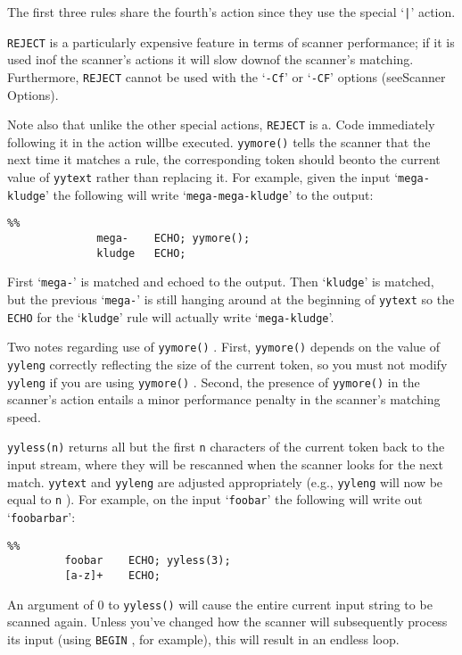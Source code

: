 \documentclass[openany,oneside]{book}
\begin{document}
The first three rules share the fourth's action since they use the
special ‘\verb`|`’ action.

 \verb`REJECT` is a particularly expensive feature in terms of scanner
performance; if it is used inof the scanner's actions it
will slow downof the scanner's matching.  Furthermore, \verb`REJECT` cannot be used with the ‘\verb`-Cf`’ or ‘\verb`-CF`’ options
(seeScanner Options).

Note also that unlike the other special actions, \verb`REJECT` is a.  Code immediately following it in the action willbe executed. \verb`yymore()` tells the scanner that the next time it matches a rule, the
corresponding token should beonto the current value of \verb`yytext` rather than replacing it.  For example, given the input
‘\verb`mega-kludge`’ the following will write ‘\verb`mega-mega-kludge`’ to
the output:


\begin{verbatim}
%%
              mega-    ECHO; yymore();
              kludge   ECHO;
\end{verbatim}


First ‘\verb`mega-`’ is matched and echoed to the output.  Then ‘\verb`kludge`’
is matched, but the previous ‘\verb`mega-`’ is still hanging around at the
beginning of \verb`yytext` so the \verb`ECHO` for the ‘\verb`kludge`’ rule will actually write ‘\verb`mega-kludge`’.

Two notes regarding use of \verb`yymore()` .  First, \verb`yymore()` depends on the value of \verb`yyleng` correctly reflecting the size of
the current token, so you must not modify \verb`yyleng` if you are using \verb`yymore()` .  Second, the presence of \verb`yymore()` in the
scanner's action entails a minor performance penalty in the scanner's
matching speed.

 \verb`yyless(n)` returns all but the first \verb`n` characters of the
current token back to the input stream, where they will be rescanned
when the scanner looks for the next match. \verb`yytext` and \verb`yyleng` are adjusted appropriately (e.g., \verb`yyleng` will now
be equal to \verb`n` ).  For example, on the input ‘\verb`foobar`’ the
following will write out ‘\verb`foobarbar`’:


\begin{verbatim}
%%
         foobar    ECHO; yyless(3);
         [a-z]+    ECHO;
\end{verbatim}


An argument of 0 to \verb`yyless()` will cause the entire current input
string to be scanned again.  Unless you've changed how the scanner will
subsequently process its input (using \verb`BEGIN` , for example), this
will result in an endless loop.
\end{document}
